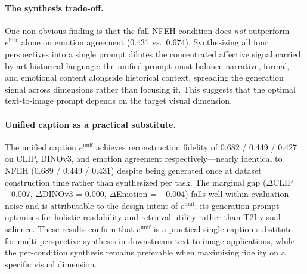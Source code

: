 \paragraph{The synthesis trade-off.}
One non-obvious finding is that the full NFEH condition does \emph{not} outperform $e^{\text{hist}}$ alone on emotion agreement (0.431 vs.\ 0.674).
Synthesizing all four perspectives into a single prompt dilutes the concentrated affective signal carried by art-historical language: the unified prompt must balance narrative, formal, and emotional content alongside historical context, spreading the generation signal across dimensions rather than focusing it.
This suggests that the optimal text-to-image prompt depends on the target visual dimension.

\paragraph{Unified caption as a practical substitute.}
The unified caption $e^{\text{unif}}$ achieves reconstruction fidelity of 0.682 / 0.449 / 0.427 on CLIP, DINOv3, and emotion agreement respectively---nearly identical to NFEH (0.689 / 0.449 / 0.431) despite being generated once at dataset construction time rather than synthesized per task.
The marginal gap ($\Delta$CLIP = $-$0.007, $\Delta$DINOv3 = 0.000, $\Delta$Emotion = $-$0.004) falls well within evaluation noise and is attributable to the design intent of $e^{\text{unif}}$: its generation prompt optimises for holistic readability and retrieval utility rather than T2I visual salience.
These results confirm that $e^{\text{unif}}$ is a practical single-caption substitute for multi-perspective synthesis in downstream text-to-image applications, while the per-condition synthesis remains preferable when maximising fidelity on a specific visual dimension.